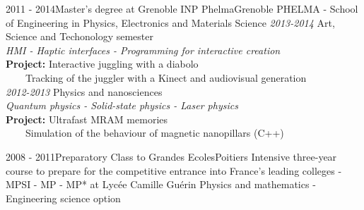 \documentclass[a4paper]{genard-cv}
\begin{document}
\begin{body}
	\education
		\begin{entry}
			{2011 - 2014}{Master's degree at Grenoble INP Phelma}{Grenoble}
			{PHELMA - School of Engineering in Physics, Electronics and Materials Science}
			\textit{2013-2014} Art, Science and Techonology semester\\
			\textit{HMI - Haptic interfaces - Programming for interactive creation}\\
			\textbf{Project:} Interactive juggling with a diabolo\\
      ~~~~Tracking of the juggler with a Kinect and audiovisual generation
			\medskip\\

			\textit{2012-2013} Physics and nanosciences\\
			\textit{Quantum physics - Solid-state physics - Laser physics}\\
			\textbf{Project:} Ultrafast MRAM memories\\
			~~~~Simulation of the behaviour of magnetic nanopillars (C++)
			\medskip\\

		\end{entry}
		\begin{entry}
			{2008 - 2011}{Preparatory Class to Grandes Ecoles}{Poitiers}
			{Intensive three-year course to prepare for the competitive entrance
			into France’s leading colleges - MPSI - MP - MP* at Lycée Camille Guérin}
			Physics and mathematics - Engineering science option
		\end{entry}

\end{body}
\end{document}
